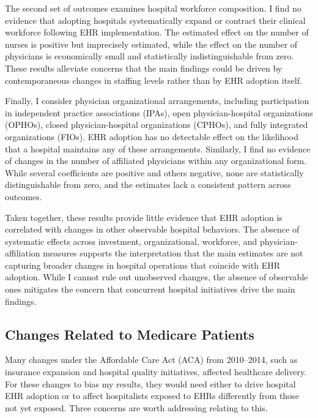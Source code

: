\documentclass[12pt]{article}
\begin{document}
The second set of outcomes examines hospital workforce composition. I find no evidence that adopting hospitals systematically expand or contract their clinical workforce following EHR implementation. The estimated effect on the number of nurses is positive but imprecisely estimated, while the effect on the number of physicians is economically small and statistically indistinguishable from zero. These results alleviate concerns that the main findings could be driven by contemporaneous changes in staffing levels rather than by EHR adoption itself.

Finally, I consider physician organizational arrangements, including participation in independent practice associations (IPAs), open physician-hospital organizations (OPHOs), closed physician-hospital organizations (CPHOs), and fully integrated organizations (FIOs). EHR adoption has no detectable effect on the likelihood that a hospital maintains any of these arrangements. Similarly, I find no evidence of changes in the number of affiliated physicians within any organizational form. While several coefficients are positive and others negative, none are statistically distinguishable from zero, and the estimates lack a consistent pattern across outcomes.

Taken together, these results provide little evidence that EHR adoption is correlated with changes in other observable hospital behaviors. The absence of systematic effects across investment, organizational, workforce, and physician-affiliation measures supports the interpretation that the main estimates are not capturing broader changes in hospital operations that coincide with EHR adoption. While I cannot rule out unobserved changes, the absence of observable ones mitigates the concern that concurrent hospital initiatives drive the main findings.

\subsection{Changes Related to Medicare Patients}\label{sec:aca}

Many changes under the Affordable Care Act (ACA) from 2010--2014, such as
insurance expansion and hospital quality initiatives, affected healthcare
delivery. For these changes to bias my results, they would need either to drive hospital EHR adoption or to affect hospitalists exposed to EHRs differently from those not yet exposed. Three concerns are worth addressing relating to this. 
\end{document}
